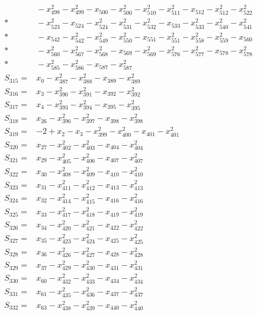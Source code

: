 \begin{align*}
&{}-x_{498}^{2}-x_{499}^{2}-x_{500}-x_{500}^{2}-x_{510}^{2}-x_{511}^{2}-x_{512}-x_{512}^{2}-x_{522}^{2}\\*
&{}-x_{523}^{2}-x_{524}-x_{524}^{2}-x_{531}^{2}-x_{532}^{2}-x_{533}-x_{533}^{2}-x_{540}^{2}-x_{541}^{2}\\*
&{}-x_{542}-x_{542}^{2}-x_{549}^{2}-x_{550}^{2}-x_{551}-x_{551}^{2}-x_{558}^{2}-x_{559}^{2}-x_{560}\\*
&{}-x_{560}^{2}-x_{567}^{2}-x_{568}^{2}-x_{569}-x_{569}^{2}-x_{576}^{2}-x_{577}^{2}-x_{578}-x_{578}^{2}\\*
&{}-x_{585}^{2}-x_{586}^{2}-x_{587}-x_{587}^{2}\\[3pt]
S_{315}={}&x_{0}-x_{387}^{2}-x_{388}^{2}-x_{389}-x_{389}^{2}\\[3pt]
S_{316}={}&x_{3}-x_{390}^{2}-x_{391}^{2}-x_{392}-x_{392}^{2}\\[3pt]
S_{317}={}&x_{4}-x_{393}^{2}-x_{394}^{2}-x_{395}-x_{395}^{2}\\[3pt]
S_{318}={}&x_{26}-x_{396}^{2}-x_{397}^{2}-x_{398}-x_{398}^{2}\\[3pt]
S_{319}={}&-2+x_{2}-x_{3}-x_{399}^{2}-x_{400}^{2}-x_{401}-x_{401}^{2}\\[3pt]
S_{320}={}&x_{27}-x_{402}^{2}-x_{403}^{2}-x_{404}-x_{404}^{2}\\[3pt]
S_{321}={}&x_{29}-x_{405}^{2}-x_{406}^{2}-x_{407}-x_{407}^{2}\\[3pt]
S_{322}={}&x_{30}-x_{408}^{2}-x_{409}^{2}-x_{410}-x_{410}^{2}\\[3pt]
S_{323}={}&x_{31}-x_{411}^{2}-x_{412}^{2}-x_{413}-x_{413}^{2}\\[3pt]
S_{324}={}&x_{32}-x_{414}^{2}-x_{415}^{2}-x_{416}-x_{416}^{2}\\[3pt]
S_{325}={}&x_{33}-x_{417}^{2}-x_{418}^{2}-x_{419}-x_{419}^{2}\\[3pt]
S_{326}={}&x_{34}-x_{420}^{2}-x_{421}^{2}-x_{422}-x_{422}^{2}\\[3pt]
S_{327}={}&x_{35}-x_{423}^{2}-x_{424}^{2}-x_{425}-x_{425}^{2}\\[3pt]
S_{328}={}&x_{36}-x_{426}^{2}-x_{427}^{2}-x_{428}-x_{428}^{2}\\[3pt]
S_{329}={}&x_{37}-x_{429}^{2}-x_{430}^{2}-x_{431}-x_{431}^{2}\\[3pt]
S_{330}={}&x_{60}-x_{432}^{2}-x_{433}^{2}-x_{434}-x_{434}^{2}\\[3pt]
S_{331}={}&x_{61}-x_{435}^{2}-x_{436}^{2}-x_{437}-x_{437}^{2}\\[3pt]
S_{332}={}&x_{63}-x_{438}^{2}-x_{439}^{2}-x_{440}-x_{440}^{2}\\[3pt]

\end{align*}

